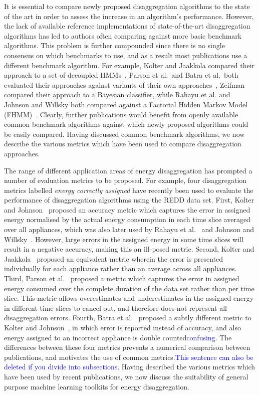 \documentclass{sig-alternate}
\newcommand{\bluecolor}[1]{\textcolor{blue}{#1}}
\begin{document}
It is essential to compare newly proposed disaggregation algorithms to the state of the art in order to assess the increase in an algorithm's performance. However, the lack of available reference implementations of state-of-the-art disaggregation algorithms has led to authors often comparing against more basic benchmark algorithms. This problem is further compounded since there is no single consensus on which benchmarks to use, and as a result most publications use a different benchmark algorithm. For example, Kolter and Jaakkola compared their approach to a set of decoupled HMMs~\cite{kolter_2012}, Parson et al.\ and Batra et al.\ both evaluated their approaches against variants of their own approaches~\cite{parson_2012,batra_2013}, Zeifman compared their approach to a Bayesian classifier, while Rahayu et al. and Johnson and Willsky both compared against a Factorial Hidden Markov Model (FHMM)~\cite{rahayu_2012,johnson_2013}. Clearly, further publications would benefit from openly available common benchmark algorithms against which newly proposed algorithms could be easily compared. Having discussed common benchmark algorithms, we now describe the various metrics which have been used to compare disaggregation approaches.

The range of different application areas of energy disaggregation has prompted a number of evaluation metrics to be proposed. For example, four disaggregation metrics labelled \emph{energy correctly assigned} have recently been used to evaluate the performance of disaggregation algorithms using the REDD data set. First, Kolter and Johnson~\cite{redd} proposed an accuracy metric which captures the error in assigned energy normalised by the actual energy consumption in each time slice averaged over all appliances, which was also later used by Rahayu et al.~\cite{rahayu_2012} and Johnson and Willsky~\cite{johnson_2013}. However, large errors in the assigned energy in some time slices will result in a negative accuracy, making this an ill-posed metric. Second, Kolter and Jaakkola~\cite{kolter_2012} proposed an equivalent metric wherein the error is presented individually for each appliance rather than an average across all appliances. Third, Parson et al.~\cite{parson_2012} proposed a metric which captures the error in assigned energy consumed over the complete duration of the data set rather than per time slice. This metric allows overestimates and underestimates in the assigned energy in different time slices to cancel out, and therefore does not represent all disaggregation errors. Fourth, Batra et al.~\cite{batra_2013} proposed a subtly different metric to Kolter and Johnson~\cite{redd}, in which error is reported instead of accuracy, and also energy assigned to an incorrect appliance is double counted\bluecolor{confusing}. The differences between these four metrics prevents a numerical comparison between publications, and motivates the use of common metrics.\bluecolor{This sentence can also be deleted if you divide into subsections.} Having described the various metrics which have been used by recent publications, we now discuss the suitability of general purpose machine learning toolkits for energy disaggregation.
\end{document}
